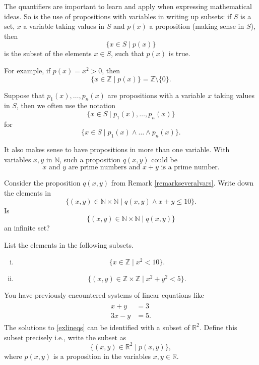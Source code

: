 The quantifiers are important to learn and apply when expressing
mathematical ideas. So is the use of propositions with variables
in writing up subsets: if $S$ is a set, $x$ a variable taking values
in $S$ and $p(x)$ a proposition (making sense in $S$), then
$$
  \{x\in S \mid p(x)\}
$$
is the subset of the elements $x\in S$, such that $p(x)$ is true.

For example, if $p(x) = x^2 > 0$, then
$$
  \{x\in \mathbb{Z} \mid p(x)\} = \mathbb{Z}\setminus \{0\}.
$$

Suppose that $p_1(x), \dots, p_n(x)$ are propositions with a variable $x$ taking values
in $S$, then we often use the notation
$$
  \{x\in S \mid p_1(x), \dots, p_n(x)\}
$$
for
$$
  \{x\in S \mid p_1(x)\land \dots\land p_n(x)\}.
$$

\begin{tcolorbox}\begin{remark}\label{remarkseveralvars}
    It also makes sense to have propositions in more than one variable. With
    variables $x, y$ in $\mathbb{N}$, such a proposition $q(x, y)$ could be
    $$
      x\text{ and }y\text{ are prime numbers and } x + y \text{ is a prime number}.
    $$
  \end{remark}\end{tcolorbox}

\begin{exercise}
  Consider the proposition $q(x, y)$ from Remark \ref{remarkseveralvars}. Write
  down the elements in
  $$
    \{(x, y)\in \mathbb{N}\times \mathbb{N} \mid q(x, y) \land x + y \leq 10\}.
  $$
  Is
  $$
    \{(x, y) \in \mathbb{N}\times \mathbb{N}\mid q(x, y)\}
  $$
  an infinite set?
\end{exercise}

\begin{exercise}
  List the elements in the following subsets.
  \begin{enumerate}[(i)]
    \item
          $$
            \{x\in \mathbb{Z} \mid x^2 < 10\}.
          $$
    \item
          $$
            \{(x, y)\in \mathbb{Z}\times \mathbb{Z} \mid x^2 + y^2 < 5\}.
          $$
  \end{enumerate}
\end{exercise}

\begin{exercise}
  You have previously encountered systems of linear equations like
  \begin{align}\begin{split}\label{exlineqs}
      x + y  & = 3   \\
      3x - y & =  5.
    \end{split}\end{align}
  The solutions to \eqref{exlineqs} can be identified with a subset of
  $\mathbb{R}^2$. Define this subset precisely i.e., write the subset as
  $$
    \{(x, y)\in \mathbb{R}^2 \mid p(x, y)\},
  $$
  where $p(x, y)$ is a proposition in the variables $x, y\in \mathbb{R}$.
\end{exercise}


